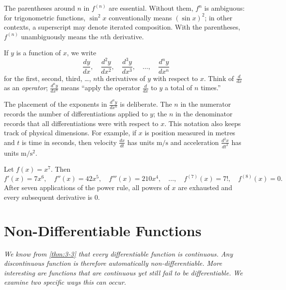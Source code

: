 \begin{remark}[Warning]
The parentheses around $n$ in $f^{(n)}$ are essential.  Without them, $f^{n}$ is ambiguous: for trigonometric functions, $\sin^{2} x$ conventionally means $(\sin x)^{2}$; in other contexts, a superscript may denote iterated composition.  With the parentheses, $f^{(n)}$ unambiguously means the $n$th derivative.
\end{remark}

\begin{definition}
\label{def:3-7}
If $y$ is a function of $x$, we write
\[
  \dfrac{dy}{dx},\quad \dfrac{d^{2}y}{dx^{2}},\quad \dfrac{d^{3}y}{dx^{3}},\quad \ldots,\quad \dfrac{d^{n}y}{dx^{n}}
\]
for the first, second, third, \ldots, $n$th derivatives of $y$ with respect to $x$.  Think of $\frac{d}{dx}$ as an \emph{operator}; $\frac{d^{n}y}{dx^{n}}$ means ``apply the operator $\frac{d}{dx}$ to $y$ a total of $n$ times.''
\end{definition}

\begin{remark}
The placement of the exponents in $\frac{d^{n}y}{dx^{n}}$ is deliberate.  The $n$ in the numerator records the number of differentiations applied to $y$; the $n$ in the denominator records that all differentiations were with respect to $x$.  This notation also keeps track of physical dimensions.  For example, if $x$ is position measured in metres and $t$ is time in seconds, then velocity $\frac{dx}{dt}$ has units $\text{m}/\text{s}$ and acceleration $\frac{d^{2}x}{dt^{2}}$ has units $\text{m}/\text{s}^{2}$.
\end{remark}

\begin{example}
\label{ex:3-6}
Let $f(x) = x^{7}$.  Then
\[
  f'(x) = 7x^{6},\quad f''(x) = 42x^{5},\quad f'''(x) = 210x^{4},\quad \ldots,\quad f^{(7)}(x) = 7!,\quad f^{(8)}(x) = 0.
\]
After seven applications of the power rule, all powers of $x$ are exhausted and every subsequent derivative is $0$.
\end{example}

\section{Non-Differentiable Functions}
\label{sec:3.9}

\textit{We know from \cref{thm:3-3} that every differentiable function is continuous.  Any discontinuous function is therefore automatically non-differentiable.  More interesting are functions that are continuous yet still fail to be differentiable.  We examine two specific ways this can occur.}

